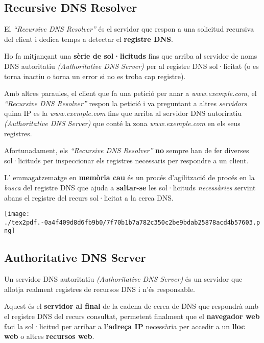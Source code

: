 \documentclass[]{article}
\begin{document}
\hypertarget{recursive-dns-resolver}{%
\subsection{\texorpdfstring{\textbf{Recursive DNS
Resolver}}{Recursive DNS Resolver}}\label{recursive-dns-resolver}}

El \emph{``Recursive DNS Resolver''} és el servidor que respon a una
solicitud recursiva del client i dedica temps a detectar el
\textbf{registre DNS}.

Ho fa mitjançant una \textbf{sèrie de sol·licituds} fins que arriba al
servidor de noms DNS autoritatiu \emph{(Authoritative DNS Server)} per
al registre DNS sol·licitat (o es torna inactiu o torna un error si no
es troba cap registre).

Amb altres paraules, el client que fa una petició per anar a
\emph{www.exemple.com}, el \emph{``Recursive DNS Resolver''} respon la
petició i va preguntant a altres \emph{servidors} quina IP es la
\emph{www.exemple.com} fins que arriba al servidor DNS autoriratiu
\emph{(Authoritative DNS Server)} que conté la zona
\emph{www.exemple.com} en els seus registres.

Afortunadament, els \emph{``Recursive DNS Resolver''} \textbf{no} sempre
han de fer diverses sol·licituds per inspeccionar els registres
necessaris per respondre a un client.

L' emmagatzematge en \textbf{memòria cau} és un procés d'agilització de
procés en la \emph{busca} del registre DNS que ajuda a
\textbf{saltar-se} les sol·licituds \emph{necessàries} servint abans el
registre del recurs sol·licitat a la cerca DNS.

\texttt{[image: ./tex2pdf.-0a4f409d8d6fb9b0/7f70b1b7a782c350c2be9bdab25878acd4b57603.png]}

\hypertarget{authoritative-dns-server}{%
\subsection{\texorpdfstring{\textbf{Authoritative DNS
Server}}{Authoritative DNS Server}}\label{authoritative-dns-server}}

Un servidor DNS autoritatiu \emph{(Authoritative DNS Server)} és un
servidor que allotja realment registres de recursos DNS i n'és
responsable.

Aquest és el \textbf{servidor al final} de la cadena de cerca de DNS que
respondrà amb el registre DNS del recurs consultat, permetent finalment
que el \textbf{navegador web} faci la sol·licitud per arribar a
\textbf{l'adreça IP} necessària per accedir a un \textbf{lloc web} o
altres \textbf{recursos web}.
\end{document}

